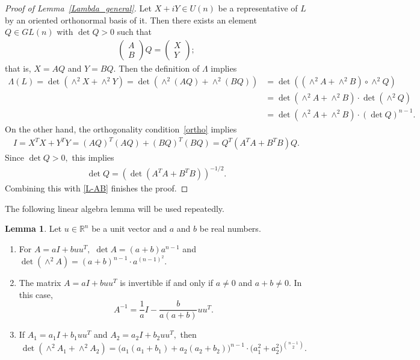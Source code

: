 \documentclass[11pt]{amsart}
\numberwithin{equation}{section}
\theoremstyle{definition}
\theoremstyle{definition}
\newtheorem{lemma}[equation]{Lemma}
\newcommand{\pr}[1]{\left(#1\right)}
\begin{document}
\begin{proof}
[Proof of Lemma~\ref{Lambda_general}]
	Let $X+iY\in U(n)$ be a representative of $L$ by an oriented orthonormal basis of it.
	Then there exists an element~$Q\in {GL}(n)$ with $\det Q>0$ such that
	\begin{align*}
	\begin{pmatrix}
	A\\B
	\end{pmatrix}Q
	= \begin{pmatrix}
	X\\Y
	\end{pmatrix};
	\end{align*}
	that is, $X=AQ$ and $Y=BQ.$
	Then the definition of $\Lambda$ implies
	\begin{equation}\label{L-AB}
	\begin{split}
	\Lambda(L)
	= \det\pr{\wedge^2 X + \wedge^2 Y}
	= \det\pr{\wedge^2 (AQ) + \wedge^2 (BQ)}
	& = \det\pr{\pr{\wedge^2 A + \wedge^2 B}\circ \wedge^2Q}\\
	& = \det\pr{\wedge^2 A + \wedge^2 B}
	\cdot \det \pr{\wedge^2 Q}\\
	& = \det\pr{\wedge^2 A + \wedge^2 B}
	\cdot \pr{\det Q}^{n-1}.
	\end{split}
	\end{equation}
	On the other hand, the orthogonality condition~\eqref{ortho} implies
	\begin{align*}
	I = X^TX + Y^TY
	= (AQ)^T(AQ) + (BQ)^T(BQ)
	= Q^T\pr{A^TA+B^TB}Q.
	\end{align*}
	Since $\det Q>0,$ this implies
	\begin{align*}
	\det Q = \pr{\det\pr{A^TA+B^TB}}^{-1/2}.
	\end{align*}
	Combining this with \eqref{L-AB} finishes the proof.
\end{proof}

The following linear algebra lemma will be used repeatedly. 

\begin{lemma}\label{aI+buu^T}
Let \(u\in \mathbb R^n\) be a unit vector and $a$ and $b$ be real numbers.
\begin{enumerate}
\item[(i)] For $A=aI+buu^T,$ 
$\det A=(a+b)a^{n-1}$ and
$\det(\wedge^2 A) =(a+b)^{n-1}\cdot a^{(n-1)^2}.$

\item[(ii)] The matrix \(A=aI + buu^T\) is invertible if and only if $a\neq 0$ and $a+b\neq 0.$
In this case,
\[
A^{-1}
=
\frac{1}{a}I-\frac{b}{a(a+b)}uu^T.
\]

\item[(iii)] If $A_1=a_1I+b_1uu^T$ and $A_2=a_2I+b_2uu^T,$
then
\begin{equation}
\det(\wedge^2 A_1+\wedge^2 A_2)
=
\bigl(a_1(a_1+b_1)+a_2(a_2+b_2)\bigr)^{n-1}
\cdot \bigl(a_1^2+a_2^2\bigr)^{\binom{n-1}{2}}.
\end{equation}
\end{enumerate}
\end{lemma}
\end{document}
